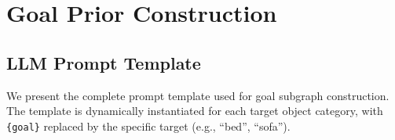 \documentclass{article}
\begin{document}







\newpage
\appendix

\section{Goal Prior Construction}
\label{sec:goal_construction}

\subsection{LLM Prompt Template}

We present the complete prompt template used for goal subgraph construction. The template is dynamically instantiated for each target object category, with \texttt{\{goal\}} replaced by the specific target (e.g., ``bed'', ``sofa'').
\end{document}
